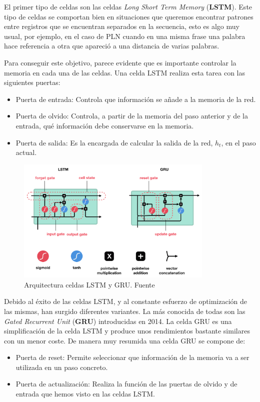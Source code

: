 El primer tipo de celdas  son las celdas \textit{Long Short Term Memory} (\textbf{LSTM}). Este tipo de celdas se comportan bien en situaciones que queremos encontrar patrones entre registros que se encuentran separados en la secuencia, esto es algo muy usual, por ejemplo, en el caso de PLN cuando en una misma frase una palabra hace referencia a otra que apareció a una distancia de varias palabras. 
	
Para conseguir este objetivo, parece evidente que es importante controlar la memoria en cada una de las celdas. Una celda LSTM realiza esta tarea con las siguientes puertas: 
	\begin{itemize}
		\item Puerta de entrada: Controla que información se añade a la memoria de la red. 
		\item Puerta de olvido: Controla, a partir de la memoria del paso anterior y de la entrada, qué información debe conservarse en la memoria. 
		\item Puerta de salida:  Es la encargada de calcular la salida de la red, $h_{t}$, en el paso actual. 
	\end{itemize}

\begin{figure}[!ht]
	\centering
	\includegraphics[width=0.84\textwidth]{images/arte/lstmvsgru}
	\caption{Arquitectura celdas LSTM y GRU. Fuente \cite{lstmgru}}
	\label{fig:lstmvsgru}
\end{figure}



Debido al éxito de las celdas LSTM, y al constante esfuerzo de optimización de las mismas, han surgido diferentes variantes. La más conocida de todas son las \textit{Gated Recurrent Unit} (\textbf{GRU}) introducidas en 2014. La celda GRU es una simplificación de la celda LSTM y produce unos rendimientos bastante similares con un menor coste. De manera muy resumida una celda GRU se compone de: 
\begin{itemize}
	\item Puerta de reset: Permite seleccionar que información de la memoria va a ser utilizada en un paso concreto. 
	\item Puerta de actualización: Realiza la función de las puertas de olvido y de entrada que hemos visto en las celdas LSTM.
\end{itemize}

